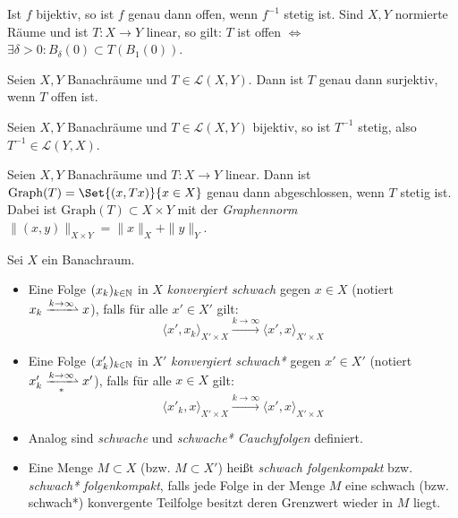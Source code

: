 \documentclass{cheat-sheet}
\newcommand{\convWith}[1]{\xrightarrow{#1 \to \infty}} %
\newcommand{\convWeaklyWith}[1]{\xrightharpoonup{#1 \to \infty}} %
\newcommand{\convWeaklyStarWith}[1]{\xrightharpoonup[*]{#1 \to \infty}} %
\begin{document}
\begin{bem}
  Ist $f$ bijektiv, so ist $f$ genau dann offen, wenn $f^{-1}$ stetig ist. Sind $X, Y$ normierte Räume und ist $T : X \to Y$ linear, so gilt: $T$ ist offen $\iff$ $\exists \delta > 0 : B_{\delta}(0) \subset T(B_1(0))$.
\end{bem}

\begin{satz}
  Seien $X, Y$ Banachräume und $T \in \mathcal{L}(X, Y)$. Dann ist $T$ genau dann surjektiv, wenn $T$ offen ist.
\end{satz}

\begin{satz}
  Seien $X, Y$ Banachräume und $T \in \mathcal{L}(X, Y)$ bijektiv, so ist $T^{-1}$ stetig, also $T^{-1} \in \mathcal{L}(Y, X)$.
\end{satz}

\begin{satz}
  Seien $X, Y$ Banachräume und $T : X \to Y$ linear. Dann ist $\mathrm{Graph}(T) = \Set{ (x, Tx) }{ x \in X }$ genau dann abgeschlossen, wenn $T$ stetig ist. Dabei ist $\mathrm{Graph}(T) \subset X \times Y$ mit der \emph{Graphennorm} $\|(x,y)\|_{X \times Y} = \|x\|_X + \|y\|_Y$.
\end{satz}

\begin{defn}
  Sei $X$ ein Banachraum.
  \begin{itemize}
    \item Eine Folge $(x_k)_{k \in \mathbb{N}}$ in $X$ \emph{konvergiert schwach} gegen $x \in X$ (notiert $x_k \convWeaklyWith{k} x$), falls für alle $x' \in X'$ gilt:
    \[ \langle x', x_k \rangle_{X' \times X} \convWith{k} \langle x', x \rangle_{X' \times X} \]
    \item Eine Folge $(x'_k)_{k \in \mathbb{N}}$ in $X'$ \emph{konvergiert schwach*} gegen $x' \in X'$ (notiert $x'_k \convWeaklyStarWith{k} x'$), falls für alle $x \in X$ gilt:
    \[ \langle x'_k, x \rangle_{X' \times X} \convWith{k} \langle x', x \rangle_{X' \times X} \]
    \item Analog sind \emph{schwache} und \emph{schwache* Cauchyfolgen} definiert.
    \item Eine Menge $M \subset X$ (bzw. $M \subset X'$) heißt \emph{schwach folgenkompakt} bzw. \emph{schwach* folgenkompakt}, falls jede Folge in der Menge $M$ eine schwach (bzw. schwach*) konvergente Teilfolge besitzt deren Grenzwert wieder in $M$ liegt.
  \end{itemize}
\end{defn}
\end{document}
